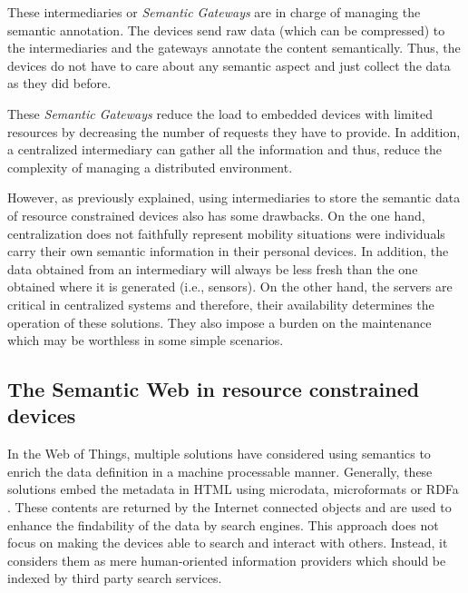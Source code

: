 These intermediaries or \emph{Semantic Gateways} are in charge of managing the semantic annotation.
The devices send raw data (which can be compressed) to the intermediaries and the gateways annotate the content semantically.
Thus, the devices do not have to care about any semantic aspect and just collect the data as they did before.

These \emph{Semantic Gateways} reduce the load to embedded devices with limited resources by decreasing the number of requests they have to provide.
In addition, a centralized intermediary can gather all the information and thus, reduce the complexity of managing a distributed environment.

However, as previously explained, using intermediaries to store the semantic data of resource constrained devices also has some drawbacks.
On the one hand, centralization does not faithfully represent mobility situations were individuals carry their own semantic information in their personal devices.
In addition, the data obtained from an intermediary will always be less fresh than the one obtained where it is generated (i.e., sensors).
On the other hand, the servers are critical in centralized systems and therefore, their availability determines the operation of these solutions.
They also impose a burden on the maintenance which may be worthless in some simple scenarios.


\subsection{The Semantic Web in resource constrained devices}



In the Web of Things, multiple solutions have considered using semantics to enrich the data definition in a machine processable manner.
Generally, these solutions embed the metadata in HTML using microdata, microformats or RDFa \citep{mayer_extensible_2011}.
These contents are returned by the Internet connected objects and are used to enhance the findability of the data by search engines.
This approach does not focus on making the devices able to search and interact with others.
Instead, it considers them as mere human-oriented information providers which should be indexed by third party search services.

